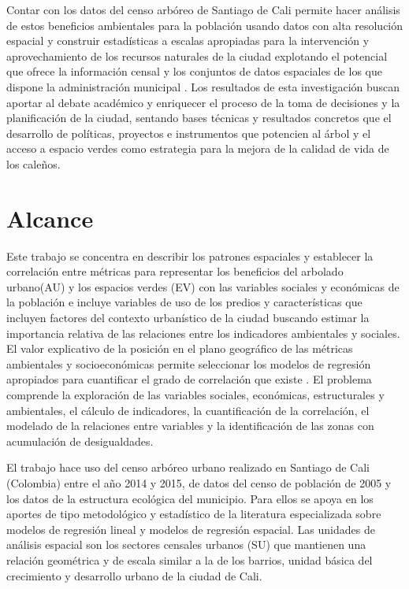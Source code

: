 \documentclass[12pt,]{book}
\begin{document}
Contar con los datos del censo arbóreo de Santiago de Cali permite hacer
análisis de estos beneficios ambientales para la población usando datos
con alta resolución espacial y construir estadísticas a escalas
apropiadas para la intervención y aprovechamiento de los recursos
naturales de la ciudad explotando el potencial que ofrece la información
censal y los conjuntos de datos espaciales de los que dispone la
administración municipal \citep{schwarz_trees_2015}. Los resultados de
esta investigación buscan aportar al debate académico y enriquecer el
proceso de la toma de decisiones y la planificación de la ciudad,
sentando bases técnicas y resultados concretos que el desarrollo de
políticas, proyectos e instrumentos que potencien al árbol y el acceso a
espacio verdes como estrategia para la mejora de la calidad de vida de
los caleños.

\section{Alcance}\label{alcance}

Este trabajo se concentra en describir los patrones espaciales y
establecer la correlación entre métricas para representar los beneficios
del arbolado urbano(AU) y los espacios verdes (EV) con las variables
sociales y económicas de la población e incluye variables de uso de los
predios y características que incluyen factores del contexto urbanístico
de la ciudad buscando estimar la importancia relativa de las relaciones
entre los indicadores ambientales y sociales. El valor explicativo de la
posición en el plano geográfico de las métricas ambientales y
socioeconómicas permite seleccionar los modelos de regresión apropiados
para cuantificar el grado de correlación que existe
\citep{fotheringham_geographically_1998}. El problema comprende la
exploración de las variables sociales, económicas, estructurales y
ambientales, el cálculo de indicadores, la cuantificación de la
correlación, el modelado de la relaciones entre variables y la
identificación de las zonas con acumulación de desigualdades.

El trabajo hace uso del censo arbóreo urbano realizado en Santiago de
Cali (Colombia) entre el año 2014 y 2015, de datos del censo de
población de 2005 y los datos de la estructura ecológica del municipio.
Para ellos se apoya en los aportes de tipo metodológico y estadístico de
la literatura especializada sobre modelos de regresión lineal y modelos
de regresión espacial. Las unidades de análisis espacial son los
sectores censales urbanos (SU) que mantienen una relación geométrica y
de escala similar a la de los barrios, unidad básica del crecimiento y
desarrollo urbano de la ciudad de Cali.
\end{document}
